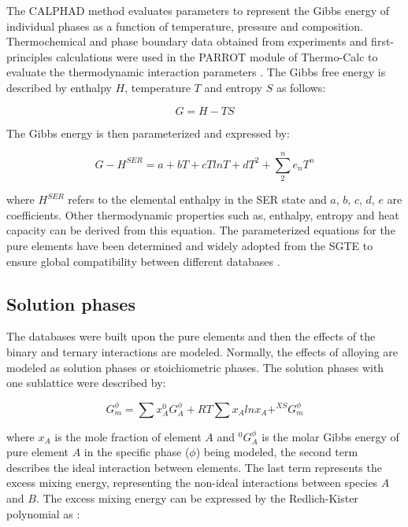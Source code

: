 The CALPHAD method evaluates parameters to represent the Gibbs energy of individual phases as a function of temperature, pressure and composition. Thermochemical and phase boundary data obtained from experiments and first-principles calculations were used in the PARROT module of Thermo-Calc to evaluate the thermodynamic interaction parameters \cite{Andersson2002}. The Gibbs free energy is described by enthalpy $H$, temperature $T$ and entropy $S$ as follows:

\begin{equation}
\label{eq: gibbs}
G = H - T S 
\end{equation}

\noindent The Gibbs energy is then parameterized and expressed by:

\begin{equation}
\label{eq: parameterizaiton}
G - H^{SER} = a + bT + cT ln T + d T^2 + \sum_{2}^{n} e_{n} T^{n}
\end{equation}

\noindent where $H^{SER}$ refers to the elemental enthalpy in the SER state and $a$, $b$, $c$, $d$, $e$ are coefficients. Other thermodynamic properties such as, enthalpy, entropy and heat capacity can be derived from this equation. The parameterized equations for the pure elements have been determined and widely adopted from the SGTE to ensure global compatibility between different databases \cite{Dinsdale1991}.

\subsection{Solution phases}

The databases were built upon the pure elements and then the effects of the binary and ternary interactions are modeled. Normally, the effects of alloying are modeled as solution phases or stoichiometric phases. The solution phases with one sublattice were described by: 

\begin{equation}
\label{eq: gibbssolution}
G_m^{\phi} = \sum x_{A} ^{0}G_{A}^{\phi} + R T \sum x_{A} ln x_{A} + ^{XS}G_{m}^{\phi}
\end{equation}

\noindent where $x_{A}$ is the mole fraction of element $A$ and $^{0}G_{A}^{\phi}$ is the molar Gibbs energy of pure element $A$ in the specific phase ($\phi$) being modeled, the second term describes the ideal interaction between elements. The last term represents the excess mixing energy, representing the non-ideal interactions between species $A$ and $B$. The excess mixing energy can be expressed by the Redlich-Kister polynomial as \cite{Redlich1948b}: 

